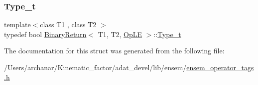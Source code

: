 \subsubsection{\texorpdfstring{Type\_t}{Type\_t}\hspace{0.1cm}{\footnotesize\ttfamily [2/2]}}
{\footnotesize\ttfamily template$<$class T1 , class T2 $>$ \\
typedef bool \mbox{\hyperlink{structBinaryReturn}{Binary\+Return}}$<$ T1, T2, \mbox{\hyperlink{structOpLE}{Op\+LE}} $>$\+::\mbox{\hyperlink{structBinaryReturn_3_01T1_00_01T2_00_01OpLE_01_4_a97477e4d06d79977296f86c374a5bc1e}{Type\+\_\+t}}}



The documentation for this struct was generated from the following file\+:\begin{DoxyCompactItemize}
\item 
/\+Users/archanar/\+Kinematic\+\_\+factor/adat\+\_\+devel/lib/ensem/\mbox{\hyperlink{lib_2ensem_2ensem__operator__tags_8h}{ensem\+\_\+operator\+\_\+tags.\+h}}\end{DoxyCompactItemize}
